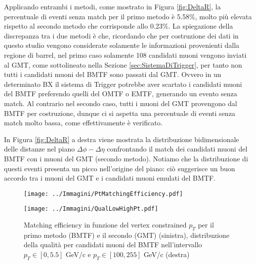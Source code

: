Applicando entrambi i metodi, come mostrato in Figura \ref{fig:DeltaR}, la percentuale di eventi senza match per il primo metodo è 5.58\%, molto più elevata rispetto al secondo metodo che corrisponde allo 0.23\%. La spiegazione della discrepanza tra i due metodi è che, ricordando che per costruzione dei dati in questo studio vengono considerate solamente le informazioni provenienti dalla regione di barrel, nel primo caso solamente 108 candidati muoni vengono inviati al GMT, come sottolineato nella Sezione \ref{sec:SistemaDiTrigger}, per tanto non tutti i candidati muoni del BMTF sono passati dal GMT. Ovvero in un determinato BX il sistema di Trigger potrebbe aver scartato i candidati muoni del BMTF preferendo quelli del OMTF o EMTF, generando un evento senza match. \newline
Al contrario nel secondo caso, tutti i muoni del GMT provengono dal BMTF per costruzione, dunque ci si aspetta una percentuale di eventi senza match molto bassa, come effettivamente è verificato.

In Figura \ref{fig:DeltaR} a destra viene mostrata la distribuzione bidimensionale delle distanze nel piano $\Delta \phi - \Delta \eta$ confrontando il match dei candidati muoni del BMTF con i muoni del GMT (secondo metodo). Notiamo che la distribuzione di questi eventi presenta un picco nell'origine del piano: ciò suggerisce un buon accordo tra i muoni del GMT e i candidati muoni emulati del BMTF.



\begin{figure}[t]
  \centering
  \begin{minipage}[b]{0.48\textwidth}
    \centering
    \texttt{[image: ../Immagini/PtMatchingEfficiency.pdf]} 
    \end{minipage}
    \hfill 
    \begin{minipage}[b]{0.45\textwidth}
      \centering
      \texttt{[image: ../Immagini/QualLowHighPt.pdf]} 
    \end{minipage}
    \caption{Matching efficiency in funzione del vertex constrained $p_T$ per il primo metodo (BMTF) e il secondo (GMT) (sinistra), distribuzione della qualità per candidati muoni del BMTF nell'intervallo $p_T \in [0, 5.5]$ GeV/c e $p_T \in [100, 255]$ GeV/c (destra)}
  \label{fig:MatchingEfficiecyLowPt}
\end{figure}





